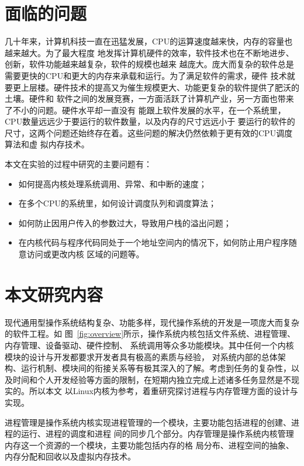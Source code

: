 \documentclass{swfcthesismscctex}
\begin{document}
\section{面临的问题}

几十年来，计算机科技一直在迅猛发展，CPU的运算速度越来快，内存的容量也越来越大。为了最大程度
地发挥计算机硬件的效率，软件技术也在不断地进步、创新，软件功能越来越复杂，软件的规模也越来
越庞大。庞大而复杂的软件总是需要更快的CPU和更大的内存来承载和运行。为了满足软件的需求，硬件
技术就要更上层楼。硬件技术的提高又为催生规模更大、功能更复杂的软件提供了肥沃的土壤。硬件和
软件之间的发展竞赛，一方面活跃了计算机产业，另一方面也带来了不小的问题。硬件水平却一直没有
能跟上软件发展的水平，在一个系统里，CPU数量远远少于要运行的软件数量，以及内存的尺寸远远小于
要运行的软件的尺寸，这两个问题还始终存在着。这些问题的解决仍然依赖于更有效的CPU调度算法和虚
拟内存技术。

本文在实验的过程中研究的主要问题有：
\begin{itemize}
\item 如何提高内核处理系统调用、异常、和中断的速度；
\item 在多个CPU的系统里，如何设计调度队列和调度算法；
\item 如何防止因用户传入的参数过大，导致用户栈的溢出问题；
\item 在内核代码与程序代码同处于一个地址空间内的情况下，如何防止用户程序随意访问或更改内核
  区域的问题等。
\end{itemize}

\section{本文研究内容}

现代通用型操作系统结构复杂、功能多样，现代操作系统的开发是一项庞大而复杂的软件工程。如
图~\ref{fig:overview}所示，操作系统内核包括文件系统、进程管理、内存管理、设备驱动、硬件控制、
系统调用等众多功能模块。其中任何一个内核模块的设计与开发都要求开发者具有极高的素质与经验，
对系统内部的总体架构、运行机制、模块间的衔接关系等有极其深入的了解。考虑到任务的复杂性，以
及时间和个人开发经验等方面的限制，在短期内独立完成上述诸多任务显然是不现实的。所以本文
以Linux内核为参考，着重研究探讨进程与内存管理方面的设计与实现。

进程管理是操作系统内核实现进程管理的一个模块，主要功能包括进程的创建、进程的运行、进程的调度和进程
间的同步几个部分。内存管理是操作系统内核管理内存这一个资源的一个模块，主要功能包括内存的格
局分布、进程空间的抽象、内存分配和回收以及虚拟内存技术。
\end{document}
